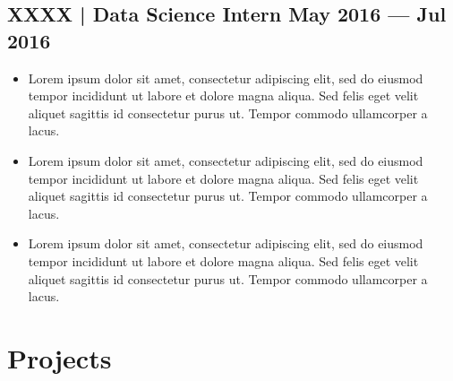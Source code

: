 \documentclass[a4,10pt]{article}
\newcommand{\subtext}[1]{
#1\par\vspace{-0.2cm}}
\newenvironment{zitemize}{
\begin{itemize}\itemsep0pt \parskip0pt \parsep1pt}
{\end{itemize}\vspace{-0.5cm}}
\begin{document}
\subsection*{XXXX | Data Science Intern \hfill May 2016 --- Jul 2016} 
\vspace{0.2cm}
\subtext{}
    \begin{zitemize}
       \item { Lorem ipsum dolor sit amet, consectetur adipiscing elit, sed do eiusmod tempor incididunt ut labore et dolore magna aliqua. Sed felis eget velit aliquet sagittis id consectetur purus ut. Tempor commodo ullamcorper a lacus. }
         \item {Lorem ipsum dolor sit amet, consectetur adipiscing elit, sed do eiusmod tempor incididunt ut labore et dolore magna aliqua. Sed felis eget velit aliquet sagittis id consectetur purus ut. Tempor commodo ullamcorper a lacus.}
          \item { Lorem ipsum dolor sit amet, consectetur adipiscing elit, sed do eiusmod tempor incididunt ut labore et dolore magna aliqua. Sed felis eget velit aliquet sagittis id consectetur purus ut. Tempor commodo ullamcorper a lacus. }
         
        
    \end{zitemize}



\section{Projects} %



\end{document}
